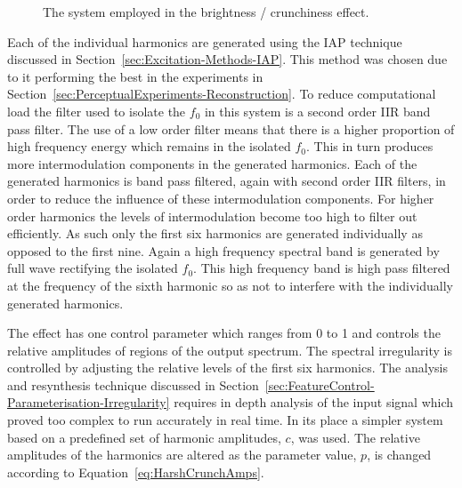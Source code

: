 \begin{figure}[h!]
				\caption{The system employed in the brightness / crunchiness effect.}
				\label{fig:HarshCrunch}
			\end{figure}

			Each of the individual harmonics are generated using the IAP technique discussed in
			Section~\ref{sec:Excitation-Methods-IAP}. This method was chosen due to it performing the best in
			the experiments in Section~\ref{sec:PerceptualExperiments-Reconstruction}. To reduce computational
			load the filter used to isolate the $f_{0}$ in this system is a second order IIR band pass filter.
			The use of a low order filter means that there is a higher proportion of high frequency energy
			which remains in the isolated $f_{0}$. This in turn produces more intermodulation components in the
			generated harmonics. Each of the generated harmonics is band pass filtered, again with second order
			IIR filters, in order to reduce the influence of these intermodulation components. For higher order
			harmonics the levels of intermodulation become too high to filter out efficiently. As such only the
			first six harmonics are generated individually as opposed to the first nine. Again a high frequency
			spectral band is generated by full wave rectifying the isolated $f_{0}$. This high frequency band
			is high pass filtered at the frequency of the sixth harmonic so as not to interfere with the
			individually generated harmonics.

			The effect has one control parameter which ranges from 0 to 1 and controls the relative amplitudes
			of regions of the output spectrum. The spectral irregularity is controlled by adjusting the
			relative levels of the first six harmonics. The analysis and resynthesis technique discussed in
			Section~\ref{sec:FeatureControl-Parameterisation-Irregularity} requires in depth analysis of the
			input signal which proved too complex to run accurately in real time. In its place a simpler system
			based on a predefined set of harmonic amplitudes, $c$, was used. The relative amplitudes of the
			harmonics are altered as the parameter value, $p$, is changed according to
			Equation~\ref{eq:HarshCrunchAmps}.

